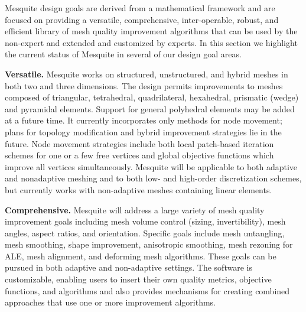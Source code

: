 Mesquite design goals are derived from a mathematical framework and
are focused on providing a versatile, comprehensive, inter-operable,
robust, and efficient library of mesh quality improvement algorithms
that can be used by the non-expert and extended and customized by
experts.  In this section we highlight the current status of Mesquite
in several of our design goal areas. \newline


{\bf Versatile.}  Mesquite works on structured, unstructured, and
hybrid meshes in both two and three dimensions. The design permits
improvements to meshes composed of triangular, tetrahedral,
quadrilateral, hexahedral, prismatic (wedge) and pyramidal elements. 
Support for general polyhedral elements may be added at a future time.  
It currently incorporates
only methods for node movement; plans for topology modification and
hybrid improvement strategies lie in the future.  Node movement
strategies include both local patch-based iteration schemes for one or
a few free vertices and global objective functions which improve all
vertices simultaneously. Mesquite will be applicable to both adaptive
and nonadaptive meshing and to both low- and high-order discretization
schemes, but currently works with non-adaptive meshes containing
linear elements. \newline

{\bf Comprehensive.}  Mesquite will address a large variety of mesh
quality improvement goals including mesh volume control (sizing,
invertibility), mesh angles, aspect ratios, and orientation. Specific
goals include mesh untangling, mesh smoothing, shape improvement,
anisotropic smoothing, mesh rezoning for ALE, mesh alignment, and
deforming mesh algorithms. These goals can be pursued in both adaptive
and non-adaptive settings. The software is customizable, enabling
users to insert their own quality metrics, objective functions, and
algorithms and also provides mechanisms for creating combined
approaches that use one or more improvement algorithms. \newline


